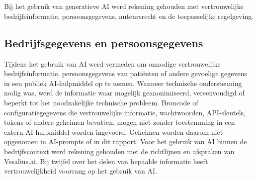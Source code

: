 \section{}%
\label{sec:ai-regelgeving}
Bij het gebruik van generatieve AI werd rekening gehouden met vertrouwelijke bedrijfsinformatie, persoonsgegevens, auteursrecht en de toepasselijke regelgeving.
\subsection*{Bedrijfsgegevens en persoonsgegevens}
Tijdens het gebruik van AI werd vermeden om onnodige vertrouwelijke bedrijfsinformatie, persoonsgegevens van patiënten of andere gevoelige gegevens in een publiek AI-hulpmiddel op te nemen. Wanneer technische ondersteuning nodig was, werd de informatie waar mogelijk geanonimiseerd, vereenvoudigd of beperkt tot het noodzakelijke technische probleem.
Broncode of configuratiegegevens die vertrouwelijke informatie, wachtwoorden, API-sleutels, tokens of andere geheimen bevatten, mogen niet zonder toestemming in een extern AI-hulpmiddel worden ingevoerd. Geheimen worden daarom niet opgenomen in AI-prompts of in dit rapport.
Voor het gebruik van AI binnen de bedrijfscontext werd rekening gehouden met de richtlijnen en afspraken van Vesalius.ai. Bij twijfel over het delen van bepaalde informatie heeft vertrouwelijkheid voorrang op het gebruik van AI.

